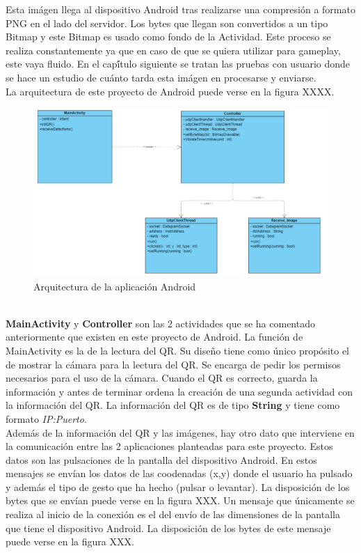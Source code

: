 Esta im\'agen llega al dispositivo Android tras realizarse una compresi\'on a formato PNG en el lado del servidor. Los bytes que llegan son convertidos a un tipo Bitmap y este Bitmap es usado como fondo de la Actividad. Este proceso se realiza constantemente ya que en caso de que se quiera utilizar para gameplay, este vaya fluido. En el cap\'ítulo siguiente se tratan las pruebas con usuario donde se hace un estudio de cu\'anto tarda esta im\'agen en procesarse y enviarse. 
\\
La arquitectura de este proyecto de Android puede verse en la figura XXXX. 
\\
\begin{figure}[h]
\centering
\includegraphics[width=1.0\textwidth]{Imagenes/Bitmap/Arquitectura_Android.png}
\caption{Arquitectura de la aplicaci\'on Android}
 \label{Arquitectura_Android}
\end{figure}
\\

\textbf{MainActivity} y \textbf{Controller} son las 2 actividades que se ha comentado anteriormente que existen en este proyecto de Android. La funci\'on de MainActivity es la de la lectura del QR. Su dise\~no tiene como \'unico prop\'osito el de mostrar la c\'amara para la lectura del QR. Se encarga de pedir los permisos necesarios para el uso de la c\'amara. Cuando el QR es correcto, guarda la informaci\'on y antes de terminar ordena la creaci\'on de una segunda actividad con la informaci\'on del QR. La informaci\'on del QR es de tipo \textbf{String} y tiene como formato \textit{IP:Puerto}. 
\\
Adem\'as de la informaci\'on del QR y las im\'agenes, hay otro dato que interviene en la comunicaci\'on entre las 2 aplicaciones planteadas para este proyecto. Estos datos son las pulsaciones de la pantalla del dispositivo Android. En estos mensajes se env\'ian los datos de las coodenadas (x,y) donde el usuario ha pulsado y adem\'as el tipo de gesto que ha hecho (pulsar o levantar). La disposici\'on de los bytes que se env\'ian puede verse en la figura XXX. Un mensaje que \'unicamente se realiza al inicio de la conexi\'on es el del env\'io de las dimensiones de la pantalla que tiene el dispositivo Android. La disposici\'on de los bytes de este mensaje puede verse en la figura XXX.


